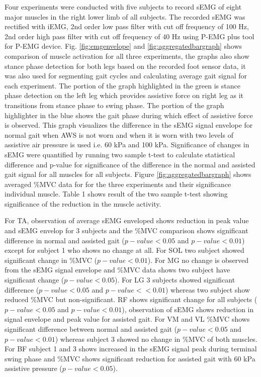 \documentclass[letterpaper, 10 pt, conference]{ieeeconf}  %
\begin{document}
Four experiments were conducted with five subjects to record sEMG of eight major muscles in the right lower limb of all subjects. The recorded sEMG was rectified with iEMG, 2nd order low pass filter with cut off frequency of 100 Hz, 2nd order high pass filter with cut off frequency of 40 Hz using P-EMG plus tool for P-EMG device. Fig. \ref{fig:emgenvelope} and \ref{fig:aggregatedbargraph} shows comparison of muscle activation for all three experiments, the graphs also show stance phase detection for both legs based on the recorded foot sensor data, it was also used for segmenting gait cycles and calculating average gait signal for each experiment.  The portion of the graph highlighted in the green is stance phase detection on the left leg which provides assistive force on right leg as it transitions  from stance phase to swing phase. The portion of the graph highlighter in the blue shows the gait phase during which effect of assistive force is observed. This graph visualizes the difference in the sEMG signal envelope for normal gait when AWS is not worn and when it is worn with two levels of assistive air pressure is used i.e. 60 kPa and 100 kPa. Significance of  changes in sEMG were quantified by running two sample t-test to calculate statistical difference and p-value for significance of the difference in the normal and assisted gait signal for all muscles for all subjects. Figure \ref{fig:aggregatedbargraph} shows averaged \%MVC data for  for the three experiments and their significance individual muscle. Table 1 shows result of the two sample t-test showing significance of the reduction in the muscle activity.

For TA, observation of average sEMG enveloped shows reduction in peak value and sEMG envelop for 3 subjects and the \%MVC comparison shows significant difference in normal and assisted gait ($p-value < 0.05$ and $p-value < 0.01$) except for subject 1 who shows no change at all. For SOL two subject showed significant change in \%MVC ($p-value < 0.01$). For MG no change is observed from the sEMG signal envelope and \%MVC data shows two subject have significant change ($p-value < 0.05$). For LG 3 subjects showed significant difference ($p-value < 0.05$ and $p-value < <0.01$) whereas two subject show reduced \%MVC but non-significant. RF shows significant change for all subjects ($p-value < 0.05$ and $p-value < 0.01$), observation of sEMG shows reduction in signal envelope and peak value for assisted gait. For VM and VL \%MVC shows significant difference between normal and assisted gait ($p-value < 0.05$ and $p-value < 0.01$) whereas subject 3 showed no change in \%MVC of both muscles. For BF subject 1 and 3 shows increased in the sEMG signal peak during terminal swing phase and \%MVC shows significant reduction for assisted gait with 60 kPa assistive pressure ($p-value < 0.05$).
\end{document}
